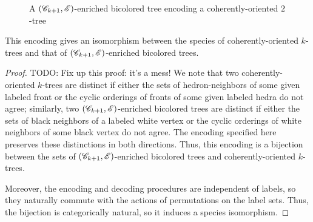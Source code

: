 \documentclass[sectionflow,singlespace,twoside,boldmathhdr]{brandiss} %
\numberwithin{section}{chapter}
\numberwithin{figure}{chapter}
\begin{document}
\begin{figure}[htb]
  \centering
  \caption{A $\left( {\mathscr{C}_{k+1}, \mathscr{E}} \right)$-enriched bicolored tree encoding a coherently-oriented $2$-tree}
  \label{fig:exbctree}
\end{figure}

\begin{theorem}\label{thm:bctreeenc}
  This encoding gives an isomorphism between the species of coherently-oriented $k$-trees and that of $\left( {\mathscr{C}_{k+1}, \mathscr{E}} \right)$-enriched bicolored trees.
\end{theorem}

\begin{proof}
  TODO: Fix up this proof: it's a mess!
  We note that two coherently-oriented $k$-trees are distinct if either the sets of hedron-neighbors of some given labeled front or the cyclic orderings of fronts of some given labeled hedra do not agree; similarly, two $\left( {\mathscr{C}_{k+1}, \mathscr{E}} \right)$-enriched bicolored trees are distinct if either the sets of black neighbors of a labeled white vertex or the cyclic orderings of white neighbors of some black vertex do not agree.
  The encoding specified here preserves these distinctions in both directions.
  Thus, this encoding is a bijection between the sets of $\left( {\mathscr{C}_{k+1}, \mathscr{E}} \right)$-enriched bicolored trees and coherently-oriented $k$-trees.

  Moreover, the encoding and decoding procedures are independent of labels, so they naturally commute with the actions of permutations on the label sets.
  Thus, the bijection is categorically natural, so it induces a species isomorphism.
\end{proof}
\end{document}

